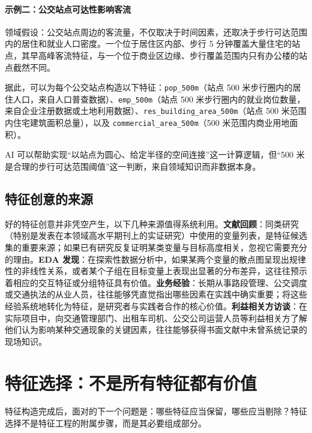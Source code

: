 \paragraph{示例二：公交站点可达性影响客流}

领域假设：公交站点周边的客流量，不仅取决于时间因素，还取决于步行可达范围内的居住和就业人口密度。一个位于居住区内部、步行 5 分钟覆盖大量住宅的站点，其早高峰客流特征，与一个位于商业区边缘、步行覆盖范围内只有办公楼的站点截然不同。

据此，可以为每个公交站点构造以下特征：\texttt{pop\_500m}（站点 500 米步行圈内的居住人口，来自人口普查数据）、\texttt{emp\_500m}（站点 500 米步行圈内的就业岗位数量，来自企业注册数据或土地利用数据）、\texttt{res\_building\_area\_500m}（站点 500 米范围内住宅建筑面积总量），以及 \texttt{commercial\_area\_500m}（500 米范围内商业用地面积）。

AI 可以帮助实现“以站点为圆心、给定半径的空间连接”这一计算逻辑，但“500 米是合理的步行可达范围阈值”这一判断，来自领域知识而非数据本身。

\subsection{特征创意的来源}

好的特征创意并非凭空产生，以下几种来源值得系统利用。\textbf{文献回顾}：同类研究（特别是发表在本领域高水平期刊上的实证研究）中使用的变量列表，是特征候选集的重要来源；如果已有研究反复证明某类变量与目标高度相关，忽视它需要充分的理由。\textbf{EDA 发现}：在探索性数据分析中，如果某两个变量的散点图呈现出规律性的非线性关系，或者某个子组在目标变量上表现出显著的分布差异，这往往预示着相应的交互特征或分组特征具有价值。\textbf{业务经验}：长期从事路段管理、公交调度或交通执法的从业人员，往往能够凭直觉指出哪些因素在实践中确实重要；将这些经验系统地转化为特征，是研究者与实践者合作的核心价值。\textbf{利益相关方访谈}：在实际项目中，向交通管理部门、出租车司机、公交公司运营人员等利益相关方了解他们认为影响某种交通现象的关键因素，往往能够获得书面文献中未曾系统记录的现场知识。


\section{特征选择：不是所有特征都有价值}

特征构造完成后，面对的下一个问题是：哪些特征应当保留，哪些应当剔除？特征选择不是特征工程的附属步骤，而是其必要组成部分。

